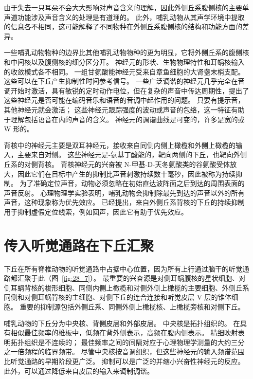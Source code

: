 由于失去一只耳朵不会大大影响对声音含义的理解，因此外侧丘系腹侧核的主要单声道功能涉及声音含义的处理是有道理的。
此外，哺乳动物从其声学环境中提取的信息各不相同，这可能解释了不同物种在外侧丘系腹侧核的结构和功能方面的差异。


一些哺乳动物物种的边界比其他哺乳动物物种的更为明显，它将外侧丘系的腹侧核和中间核以及腹侧核的细分区分开。
神经元的形状、生物物理特性和耳蜗核输入的收敛模式各不相同。
一组甘氨酸能神经元受来自章鱼细胞的大肾盏末梢支配。 
这些可以在下丘产生抑制性时间参考信号。
一些广泛调谐的神经元几乎完全在音调开始时激活，具有敏锐的定时动作电位，但在复杂的声音中传达周期性，提出了这些神经元是否可能在编码音乐和语音的音调中起作用的问题。
只要有提示音，其他神经元就会激活； 
这些神经元跟踪强度的波动或声音的包络，这一特征有助于理解包括语音在内的声音的含义。
神经元的调谐曲线是可变的，许多是宽的或 W 形的。


背核中的神经元主要是双耳神经元，接收来自同侧内侧上橄榄和外侧上橄榄的输入，主要来自对侧。
这些神经元是\ce{$\gamma$}-氨基丁酸能的，靶向两侧的下丘，也靶向外侧丘系的对侧背核。
背核神经元的兴奋被 N-甲基-D-天冬氨酸类的谷氨酸受体放大，因此它们在目标中产生的抑制比声音刺激持续数十毫秒，因此被称为持续抑制。
为了准确定位声音，动物必须忽略在初始直达波阵面之后到达的周围表面的声音反射。
心理物理学实验表明，哺乳动物会抑制除最先到达的声音以外的所有声音，这种现象称为优先效应。
已经提出，来自外侧丘系背核的下丘的持续抑制用于抑制虚假定位线索，例如回声，因此它有助于优先效应。



\section{传入听觉通路在下丘汇聚}

下丘在所有脊椎动物的听觉通路中占据中心位置，因为所有上行通过脑干的听觉通路都汇聚于此（图~\ref{fig:28_7}）。
最重要的兴奋源是对侧耳蜗腹核的星状细胞、对侧耳蜗背核的梭形细胞、同侧内侧上橄榄和对侧外侧上橄榄的主要细胞、外侧丘系同侧和对侧耳蜗背核的主细胞、对侧下丘的连合连接和听觉皮层 V 层的锥体细胞。
重要的抑制源包括外侧丘系、同侧外侧上橄榄核、上橄榄旁核和对侧下丘。


哺乳动物的下丘分为中央核、背侧皮层和外部皮层。
中央核是拓扑组织的。 
在具有相似最佳频率的椎板中，低频在背外侧表示，高频在腹内侧表示。
精细映射表明拓扑组织是不连续的； 
最佳频率之间的间隔对应于心理物理学测量的大约三分之一倍频程的临界频带。
尽管中央核按音调组织，但这些神经元的输入频谱范围比听觉通路的早期阶段更广泛。
抑制可以是广泛的并缩小兴奋性神经元的反应。
此外，可以通过降低来自皮层的输入来调制调谐。


